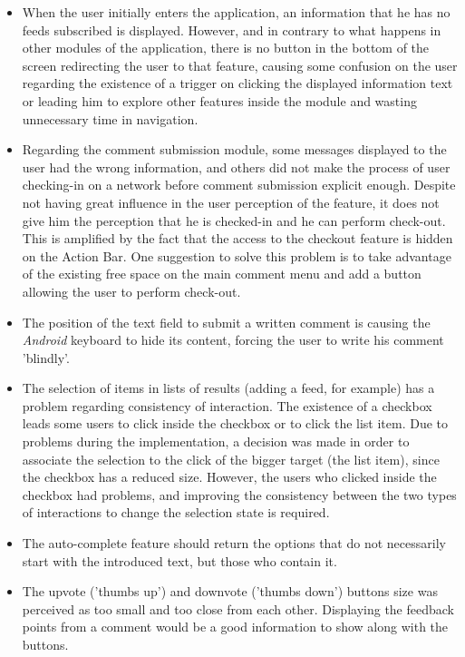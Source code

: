 \begin{itemize}
\item When the user initially enters the application, an information that he has no feeds subscribed is displayed. However, and in contrary to what happens in other modules of the application, there is no button in the bottom of the screen redirecting the user to that feature, causing some confusion on the user regarding the existence of a trigger on clicking the displayed information text or leading him to explore other features inside the module and wasting unnecessary time in navigation.

\item Regarding the comment submission module, some messages displayed to the user had the wrong information, and others did not make the process of user checking-in on a network before comment submission explicit enough. Despite not having great influence in the user perception of the feature, it does not give him the perception that he is checked-in and he can perform check-out. This is amplified by the fact that the access to the checkout feature is hidden on the Action Bar.
One suggestion to solve this problem is to take advantage of the existing free space on the main comment menu and add a button allowing the user to perform check-out.

\item The position of the text field to submit a written comment is causing the \emph{Android} keyboard to hide its content, forcing the user to write his comment 'blindly'.

\item The selection of items in lists of results (adding a feed, for example) has a problem regarding consistency of interaction. The existence of a checkbox leads some users to click inside the checkbox or to click the list item. Due to problems during the implementation, a decision was made in order to associate the selection to the click of the bigger target (the list item), since the checkbox has a reduced size. However, the users who clicked inside the checkbox had problems, and improving the consistency between the two types of interactions to change the selection state is required.

\item The auto-complete feature should return the options that do not necessarily start with the introduced text, but those who contain it.

\item The upvote ('thumbs up') and downvote ('thumbs down') buttons size was perceived as too small and too close from each other. Displaying the feedback points from a comment would be a good information to show along with the buttons.


\end{itemize}
